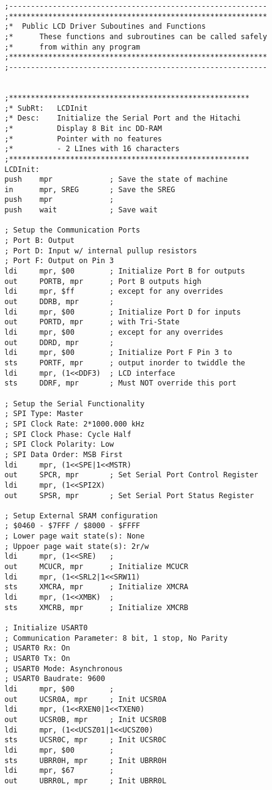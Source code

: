 \documentclass[12pt,letterpaper]{article}
\begin{document}
\begin{verbatim}
	    ;-----------------------------------------------------------
	    ;***********************************************************
	    ;*	Public LCD Driver Suboutines and Functions
	    ;*		These functions and subroutines can be called safely 
	    ;*		from within any program
	    ;***********************************************************
	    ;-----------------------------------------------------------
	    
	    
	    ;*******************************************************
	    ;* SubRt: 	LCDInit
	    ;* Desc: 	Initialize the Serial Port and the Hitachi 
	    ;*			Display 8 Bit inc DD-RAM 
	    ;*			Pointer with no features
	    ;*			- 2 LInes with 16 characters
	    ;*******************************************************
	    LCDInit:
	    push	mpr				; Save the state of machine
	    in		mpr, SREG		; Save the SREG
	    push	mpr				;
	    push	wait			; Save wait
	    
	    ; Setup the Communication Ports
	    ; Port B: Output
	    ; Port D: Input w/ internal pullup resistors
	    ; Port F: Output on Pin 3
	    ldi		mpr, $00		; Initialize Port B for outputs
	    out		PORTB, mpr		; Port B outputs high
	    ldi		mpr, $ff		; except for any overrides
	    out		DDRB, mpr		;
	    ldi		mpr, $00		; Initialize Port D for inputs
	    out		PORTD, mpr		; with Tri-State
	    ldi		mpr, $00		; except for any overrides
	    out		DDRD, mpr		;
	    ldi		mpr, $00		; Initialize Port F Pin 3 to
	    sts		PORTF, mpr		; output inorder to twiddle the
	    ldi		mpr, (1<<DDF3)	; LCD interface
	    sts		DDRF, mpr		; Must NOT override this port
	    
	    ; Setup the Serial Functionality
	    ; SPI Type: Master
	    ; SPI Clock Rate: 2*1000.000 kHz
	    ; SPI Clock Phase: Cycle Half
	    ; SPI Clock Polarity: Low
	    ; SPI Data Order: MSB First
	    ldi		mpr, (1<<SPE|1<<MSTR)
	    out		SPCR, mpr		; Set Serial Port Control Register
	    ldi		mpr, (1<<SPI2X)
	    out		SPSR, mpr		; Set Serial Port Status Register
	    
	    ; Setup External SRAM configuration
	    ; $0460 - $7FFF / $8000 - $FFFF
	    ; Lower page wait state(s): None
	    ; Uppoer page wait state(s): 2r/w
	    ldi		mpr, (1<<SRE)	; 
	    out		MCUCR, mpr		; Initialize MCUCR
	    ldi		mpr, (1<<SRL2|1<<SRW11)
	    sts		XMCRA, mpr		; Initialize XMCRA
	    ldi		mpr, (1<<XMBK)	;
	    sts		XMCRB, mpr		; Initialize XMCRB
	    
	    ; Initialize USART0
	    ; Communication Parameter: 8 bit, 1 stop, No Parity
	    ; USART0 Rx: On
	    ; USART0 Tx: On
	    ; USART0 Mode: Asynchronous
	    ; USART0 Baudrate: 9600
	    ldi		mpr, $00		;
	    out		UCSR0A, mpr		; Init UCSR0A
	    ldi		mpr, (1<<RXEN0|1<<TXEN0)
	    out		UCSR0B, mpr		; Init UCSR0B
	    ldi		mpr, (1<<UCSZ01|1<<UCSZ00)
	    sts		UCSR0C, mpr		; Init UCSR0C
	    ldi		mpr, $00		;
	    sts		UBRR0H, mpr		; Init UBRR0H
	    ldi		mpr, $67		;
	    out		UBRR0L, mpr		; Init UBRR0L
	    

\end{verbatim}
\end{document}
